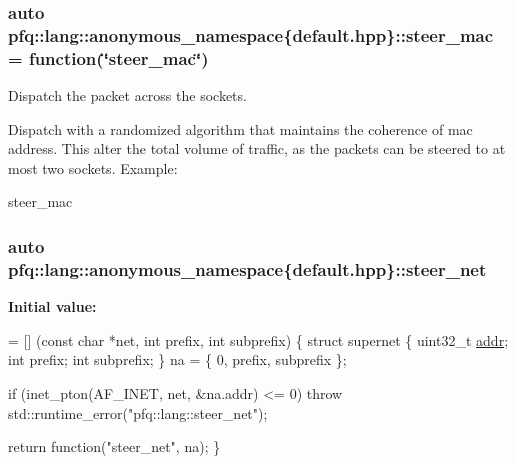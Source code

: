 \subsubsection[{\texorpdfstring{steer\+\_\+mac}{steer_mac}}]{\setlength{\rightskip}{0pt plus 5cm}auto pfq\+::lang\+::anonymous\+\_\+namespace\{default.\+hpp\}\+::steer\+\_\+mac = {\bf function}(\char`\"{}steer\+\_\+mac\char`\"{})}\hypertarget{namespacepfq_1_1lang_1_1anonymous__namespace_02default_8hpp_03_ad51e91e3b485c729ac1ba39a46e337a0}{}\label{namespacepfq_1_1lang_1_1anonymous__namespace_02default_8hpp_03_ad51e91e3b485c729ac1ba39a46e337a0}


Dispatch the packet across the sockets. 

Dispatch with a randomized algorithm that maintains the coherence of mac address. This alter the total volume of traffic, as the packets can be steered to at most two sockets. Example\+:

steer\+\_\+mac 
\subsubsection[{\texorpdfstring{steer\+\_\+net}{steer_net}}]{\setlength{\rightskip}{0pt plus 5cm}auto pfq\+::lang\+::anonymous\+\_\+namespace\{default.\+hpp\}\+::steer\+\_\+net}\hypertarget{namespacepfq_1_1lang_1_1anonymous__namespace_02default_8hpp_03_a6f8d514e40bb2b0e874fb26d2b416dc3}{}\label{namespacepfq_1_1lang_1_1anonymous__namespace_02default_8hpp_03_a6f8d514e40bb2b0e874fb26d2b416dc3}
{\bfseries Initial value\+:}
\begin{DoxyCode}
= [] (\textcolor{keyword}{const} \textcolor{keywordtype}{char} *net, \textcolor{keywordtype}{int} prefix, \textcolor{keywordtype}{int} subprefix)
        \{
            \textcolor{keyword}{struct }supernet \{
                uint32\_t \hyperlink{namespacepfq_1_1lang_1_1anonymous__namespace_02default_8hpp_03_a13cabe468839119d8d68540e3c60718b}{addr};
                \textcolor{keywordtype}{int}      prefix;
                \textcolor{keywordtype}{int}      subprefix;
            \} na = \{ 0, prefix, subprefix \};

            \textcolor{keywordflow}{if} (inet\_pton(AF\_INET, net, &na.addr) <= 0)
                \textcolor{keywordflow}{throw} std::runtime\_error(\textcolor{stringliteral}{"pfq::lang::steer\_net"});

            \textcolor{keywordflow}{return} \textcolor{keyword}{function}(\textcolor{stringliteral}{"steer\_net"}, na);
        \}
\end{DoxyCode}


